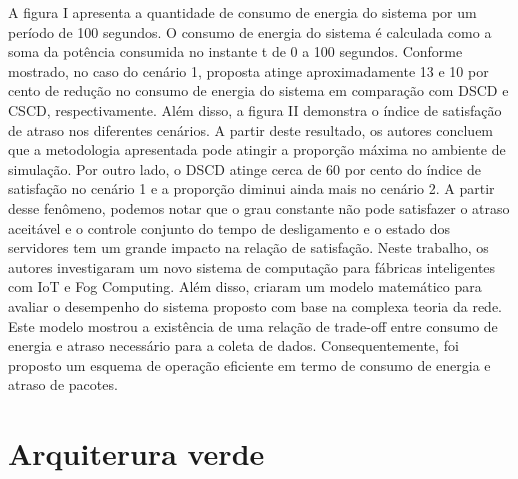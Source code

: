 A figura I apresenta a quantidade de consumo de energia do sistema por um período de 100 segundos. O consumo de energia do sistema é calculada como a soma da potência consumida no instante t de 0 a 100 segundos. Conforme mostrado, no caso do cenário 1, proposta atinge aproximadamente 13 e 10 por cento de redução no consumo de energia do sistema em comparação com DSCD e CSCD, respectivamente. Além disso, a figura II demonstra o índice de satisfação de atraso nos diferentes cenários. A partir deste resultado, os autores concluem que a metodologia apresentada pode atingir a proporção máxima no ambiente de simulação. Por outro lado, o DSCD atinge cerca de 60 por cento do índice de satisfação no cenário 1 e a proporção diminui ainda mais no cenário 2. A partir desse fenômeno, podemos notar que o grau constante não pode satisfazer o atraso aceitável e o controle conjunto do tempo de desligamento e o estado dos servidores tem um grande impacto na relação de satisfação.
Neste trabalho, os autores investigaram um novo sistema de computação para fábricas inteligentes com IoT e Fog Computing. Além disso, criaram um modelo matemático para avaliar o desempenho do sistema proposto com base na complexa teoria da rede. Este modelo mostrou a existência de uma relação de trade-off entre consumo de energia e atraso necessário para a coleta de dados. Consequentemente, foi proposto um esquema de operação eficiente em termo de consumo de energia 
e atraso de pacotes.

\section{Arquiterura verde}

